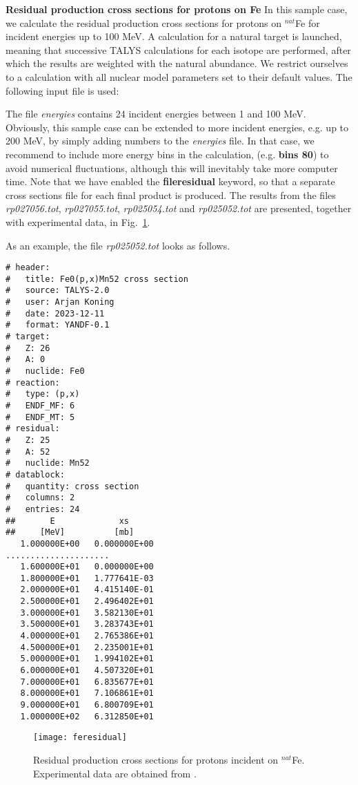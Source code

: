 \begin{samplecase}
{\bf Residual production cross sections for protons on Fe}\newline
In this sample case, we calculate the residual production cross sections for
protons on ${}^{nat}$Fe for incident energies up to 100 MeV. A calculation for
a natural target is launched, meaning that successive TALYS calculations for
each isotope are performed, after which the results are weighted with the
natural abundance. We restrict ourselves to a calculation with all
nuclear model parameters set to their default values.
The following input file is used:


The file {\em energies} contains 24 incident energies between 1 and 100 MeV.
Obviously, this sample case can be extended to more incident energies, e.g. up
to 200 MeV, by simply adding numbers to the {\em energies} file. In that case,
we recommend to include more energy bins in the
calculation, (e.g. {\bf bins 80}) to avoid numerical fluctuations, although
this will inevitably take more computer time.
Note that we have enabled the {\bf fileresidual} keyword, so that a separate
cross sections file for each final product is produced.
The results from the files {\em rp027056.tot}, {\em rp027055.tot},
{\em rp025054.tot} and {\em rp025052.tot} are
presented, together with experimental data, in Fig.~\ref{resprod}.

As an example, the file {\em rp025052.tot} looks as follows.
{\small \begin{verbatim}
# header:
#   title: Fe0(p,x)Mn52 cross section
#   source: TALYS-2.0
#   user: Arjan Koning
#   date: 2023-12-11
#   format: YANDF-0.1
# target:
#   Z: 26
#   A: 0
#   nuclide: Fe0
# reaction:
#   type: (p,x)
#   ENDF_MF: 6
#   ENDF_MT: 5
# residual:
#   Z: 25
#   A: 52
#   nuclide: Mn52
# datablock:
#   quantity: cross section
#   columns: 2
#   entries: 24
##       E             xs
##     [MeV]          [mb]
   1.000000E+00   0.000000E+00
.....................
   1.600000E+01   0.000000E+00
   1.800000E+01   1.777641E-03
   2.000000E+01   4.415140E-01
   2.500000E+01   2.496402E+01
   3.000000E+01   3.582130E+01
   3.500000E+01   3.283743E+01
   4.000000E+01   2.765386E+01
   4.500000E+01   2.235001E+01
   5.000000E+01   1.994102E+01
   6.000000E+01   4.507320E+01
   7.000000E+01   6.835677E+01
   8.000000E+01   7.106861E+01
   9.000000E+01   6.800709E+01
   1.000000E+02   6.312850E+01
\end{verbatim} } \renewcommand{\baselinestretch}{1.07}\small\normalsize
\noindent
\end{samplecase}
\begin{figure}
\centering\texttt{[image: feresidual]}
\caption{Residual production cross sections for protons incident
on ${}^{nat}$Fe. Experimental data are obtained from \protect\cite{Michel1997}.}
\label{resprod}
\end{figure}
